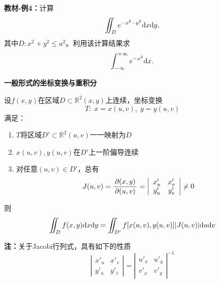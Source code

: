 \begin{center}
\end{center}

{\bf 教材-例4：}计算
$$\iint_De^{-x^2-y^2}\mathrm{d} x\mathrm{d} y,$$
其中$D:x^2+y^2\leq a^2$。利用该计算结果求
$$\displaystyle\int_{-\infty}^{+\infty}e^{-x^2}\mathrm{d} x.$$

\begin{shaded}
	{\bf 一般形式的坐标变换与重积分}
	
	设$f(x,y)$在区域$D\subset\mathbb{R}^2(x,y)$上连续，坐标变换
	$$T:\;x=x(u,v),\;y=y(u,v)$$
	满足：
	\begin{enumerate}[(1)]
	  \item $T$将区域$D'\subset\mathbb{R}^2(u,v)$一一映射为$D$
	  \item $x(u,v),y(u,v)$在$D'$上一阶偏导连续
	  \item 对任意$(u,v)\in D'$，总有
	  $$J(u,v)=\displaystyle\frac{\,{\partial(x,y)}\,}{\,{\partial(u,v)}\,}=\left|\begin{array}{cc}
	  	x'_u & x'_v \\ y'_u & y'_v
	  \end{array}\right|\ne 0$$
	\end{enumerate}
	则
	$$\iint_Df(x,y)\mathrm{d} x\mathrm{d} y=\iint_{D'}f[x(u,v),y(u,v)]|J(u,v)|\mathrm{d} u\mathrm{d} v$$
	
	{\bf 注：}关于Jacobi行列式，具有如下的性质
	$$\left|\begin{array}{cc}
	  	x'_u & x'_v \\ y'_u & y'_v
	  \end{array}\right|
	  =\left|\begin{array}{cc}
	  	u'_x & u'_y \\ v'_x & v'_y
	  \end{array}\right|^{-1}$$
\end{shaded}

